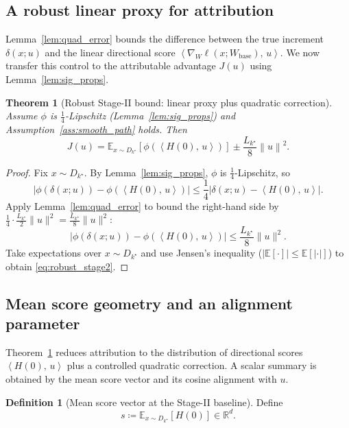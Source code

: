\documentclass{article}
\theoremstyle{plain}
\newtheorem{theorem}{Theorem}
\theoremstyle{definition}
\newtheorem{definition}{Definition}
\theoremstyle{remark}
\numberwithin{theorem}{section}
\numberwithin{definition}{section}
\numberwithin{remark}{section}
\numberwithin{lemma}{section}
\numberwithin{assumption}{section}
\newcommand{\R}{\mathbb{R}}
\newcommand{\ip}[2]{\left\langle #1,\,#2 \right\rangle}
\newcommand{\norm}[1]{\left\lVert #1 \right\rVert}
\newcommand{\E}{\mathbb{E}}
\newcommand{\tindex}{k^\star}
\newcommand{\utarget}{u}
\begin{document}
\subsection{A robust linear proxy for attribution}

Lemma~\ref{lem:quad_error} bounds the difference between the true increment $\delta(x;\utarget)$ and the linear directional score
$\ip{\nabla_W \ell(x;W_{\mathrm{base}})}{\utarget}$.
We now transfer this control to the attributable advantage $J(\utarget)$ using Lemma~\ref{lem:sig_props}.

\begin{theorem}[Robust Stage-II bound: linear proxy plus quadratic correction]
\label{thm:robust_stage2}
Assume $\phi$ is $\tfrac14$-Lipschitz (Lemma~\ref{lem:sig_props}) and Assumption~\ref{ass:smooth_path} holds.
Then
\begin{equation}
\label{eq:robust_stage2}
J(\utarget)
=
\E_{x\sim D_{\tindex}}\left[\phi\!\left(\ip{H(0)}{\utarget}\right)\right]
\pm \frac{L_{\tindex}}{8}\norm{\utarget}^2.
\end{equation}
\end{theorem}

\begin{proof}
Fix $x\sim D_{\tindex}$. By Lemma~\ref{lem:sig_props}, $\phi$ is $\tfrac14$-Lipschitz, so
\[
\left|\phi(\delta(x;\utarget))-\phi\!\left(\ip{H(0)}{\utarget}\right)\right|
\le \frac14\left|\delta(x;\utarget)-\ip{H(0)}{\utarget}\right|.
\]
Apply Lemma~\ref{lem:quad_error} to bound the right-hand side by $\frac14\cdot \frac{L_{\tindex}}{2}\|\utarget\|^2=\frac{L_{\tindex}}{8}\|\utarget\|^2$:
\[
\left|\phi(\delta(x;\utarget))-\phi\!\left(\ip{H(0)}{\utarget}\right)\right|
\le \frac{L_{\tindex}}{8}\|\utarget\|^2.
\]
Take expectations over $x\sim D_{\tindex}$ and use Jensen's inequality ($|\E[\cdot]|\le \E[|\cdot|]$) to obtain \eqref{eq:robust_stage2}.
\end{proof}

\subsection{Mean score geometry and an alignment parameter}

Theorem~\ref{thm:robust_stage2} reduces attribution to the distribution of directional scores $\ip{H(0)}{\utarget}$ plus a controlled quadratic correction.
A scalar summary is obtained by the mean score vector and its cosine alignment with $\utarget$.

\begin{definition}[Mean score vector at the Stage-II baseline]
\label{def:score}
Define
\begin{equation}
\label{eq:s}
s \coloneqq \E_{x\sim D_{\tindex}}[H(0)]\in\R^d.
\end{equation}
\end{definition}
\end{document}
